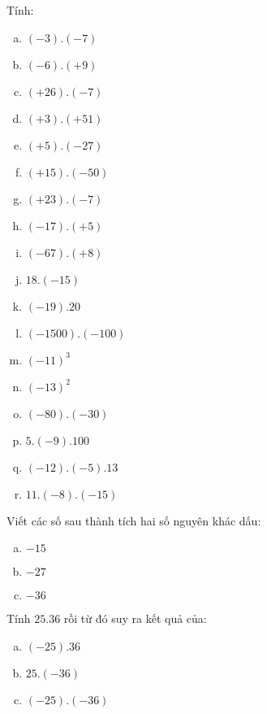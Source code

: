 \begin{bt}
Tính:
\begin{multicols}{2}
\begin{enumerate}[a)]
\item	$(-3).(-7)$
\item $(-6).(+9)$
\item $(+26).(-7)$
\item $(+3) . (+51)$
\item $(+5).(-27)$
\item $(+15) .(-50)$
\item $(+23).(-7)$
\item $(-17).(+5)$
\item $(-67).(+8)$
\item $18.(-15)$
\item $(-19).20$
\item $(-1500).(-100)$
\item $(-11)^3$
\item $(-13)^2$
\item $(-80) . (-30)$
\item $5.(-9).100$
\item $(-12).(-5).13$
\item $11.(-8).(-15)$
\end{enumerate}
\end{multicols}

\end{bt}   \begin{bt}
Viết các số sau thành tích hai số nguyên khác dấu:
\begin{enumerate}[a)]
\item $-15$ 	
\item $-27$ 	
\item $-36$  
\end{enumerate}		

\end{bt}   \begin{bt}
Tính $25.36$ rồi từ đó suy ra kết quả của:
\begin{enumerate}[a)]
\item $(-25).36$
\item $25.(-36)$
\item $(-25).(-36)$
\end{enumerate}


\end{bt}
